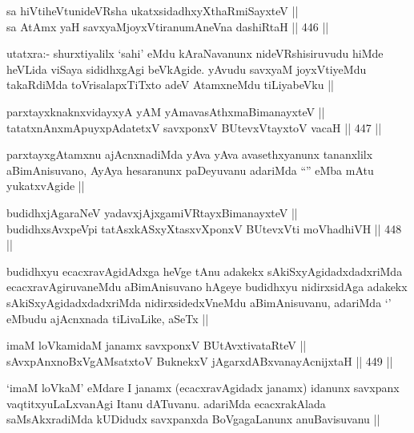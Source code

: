 \begin{shl}
sa hiVtiheVtunideVRsha ukatxsidadhxyXthaRmiSayxteV || \\
sa AtAmx yaH savxyaMjoyxVtiranumAneVna dashiRtaH ||  446 ||  
\end{shl}

\begin{artha}
utatxra:- shurxtiyalilx `sahi' eMdu kAraNavanunx nideVRshisiruvudu hiMde heVLida viSaya sididhxgAgi beVkAgide. yAvudu savxyaM joyxVtiyeMdu takaRdiMda toVrisalapxTiTxto adeV AtamxneMdu tiLiyabeVku ||
\end{artha}


\begin{shl}
parxtayxknaknxvidayxyA yAM yAmavasAthxmaBimanayxteV || \\
tatatxnAnxmApuyxpAdatetxV savxponxV BUtevxVtayxtoV vacaH ||  447 ||  
\end{shl}

\begin{artha}
parxtayxgAtamxnu ajAcnxnadiMda yAva yAva avasethxyanunx tananxlilx aBimAnisuvano, AyAya hesaranunx paDeyuvanu adariMda ``\stext'' eMba mAtu yukatxvAgide ||
\end{artha}


\begin{shl}
budidhxjAgaraNeV yadavxjAjxgamiVRtayxBimanayxteV || \\
budidhxsAvxpeV\s pi tatAsxkASxyXtasxvXponxV BUtevxVti moVhadhiVH ||  448 ||  
\end{shl}

\begin{artha}
budidhxyu ecacxravAgidAdxga heVge tAnu adakekx sAkiSxyAgidadxdadxriMda ecacxravAgiruvaneMdu aBimAnisuvano hAgeye budidhxyu nidirxsidAga adakekx sAkiSxyAgidadxdadxriMda nidirxsidedxVneMdu aBimAnisuvanu, adariMda `\stext' eMbudu ajAcnxnada tiLivaLike, aSeTx ||
\end{artha}

\begin{shl}
imaM loVkamidaM janamx savxponxV BUtAvx\s tivataRteV || \\
sAvxpAnxnoBxVgAMsatxtoV BuknekxV jAgarxdABxvanayA\s cnijxtaH ||  449 ||  
\end{shl}

\begin{artha}
`imaM loVkaM' eMdare I janamx (ecacxravAgidadx janamx) idanunx savxpanx vaqtitxyuLaLxvanAgi Itanu dATuvanu. adariMda ecacxrakAlada saMsAkxradiMda kUDidudx savxpanxda BoVgagaLanunx anuBavisuvanu ||
\end{artha}

